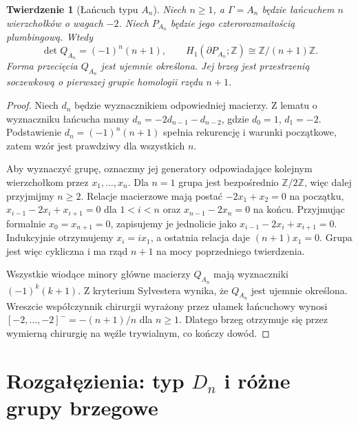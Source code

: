 \documentclass[11pt,a4paper]{report}
\numberwithin{equation}{section}
\theoremstyle{plain}
\newtheorem{twierdzenie}{Twierdzenie}[section]
\theoremstyle{definition}
\theoremstyle{remark}
\begin{document}
\begin{twierdzenie}[Łańcuch typu $A_n$]
\label{thm:tg-plumbing-An}
Niech $n\ge1$, a $\Gamma=A_n$ będzie łańcuchem
$n$ wierzchołków o wagach $-2$. Niech $P_{A_n}$
będzie jego czterorozmaitością plumbingową. Wtedy
\[
\det Q_{A_n}=(-1)^n(n+1),\qquad
H_1(\partial P_{A_n};\mathbb Z)\cong\mathbb Z/(n+1)\mathbb Z.
\]
Forma przecięcia $Q_{A_n}$ jest ujemnie określona.
Jej brzeg jest przestrzenią soczewkową o pierwszej
grupie homologii rzędu $n+1$.
\end{twierdzenie}
\begin{proof}
Niech $d_n$ będzie wyznacznikiem odpowiedniej macierzy.
Z lematu o wyznaczniku łańcucha mamy
$d_n=-2d_{n-1}-d_{n-2}$, gdzie $d_0=1$, $d_1=-2$.
Podstawienie $d_n=(-1)^n(n+1)$ spełnia rekurencję
i warunki początkowe, zatem wzór jest prawdziwy dla
wszystkich $n$.

Aby wyznaczyć grupę, oznaczmy jej generatory odpowiadające
kolejnym wierzchołkom przez $x_1,\dots,x_n$. Dla $n=1$ grupa jest bezpośrednio
$\mathbb Z/2\mathbb Z$, więc dalej przyjmijmy $n\ge2$.
Relacje
macierzowe mają postać
$-2x_1+x_2=0$ na początku,
$x_{i-1}-2x_i+x_{i+1}=0$ dla $1<i<n$ oraz
$x_{n-1}-2x_n=0$ na końcu.
Przyjmując formalnie $x_0=x_{n+1}=0$, zapisujemy je
jednolicie jako $x_{i-1}-2x_i+x_{i+1}=0$.
Indukcyjnie otrzymujemy $x_i=i x_1$, a ostatnia relacja
daje $(n+1)x_1=0$. Grupa jest więc cykliczna i ma
rząd $n+1$ na mocy poprzedniego twierdzenia.

Wszystkie wiodące minory główne macierzy $Q_{A_n}$
mają wyznaczniki $(-1)^k(k+1)$. Z kryterium Sylvestera
wynika, że $Q_{A_n}$ jest ujemnie określona.
Wreszcie współczynnik chirurgii wyrażony przez ułamek
łańcuchowy wynosi
$[-2,\dots,-2]^-=-(n+1)/n$ dla $n\ge1$.
Dlatego brzeg otrzymuje się przez wymierną chirurgię
na węźle trywialnym, co kończy dowód.
\end{proof}

\begin{center}
\end{center}

\section{Rozgałęzienia: typ \texorpdfstring{$D_n$}{Dn} i różne grupy brzegowe}
\label{sec:tg-plumbing-Dn}
\end{document}
